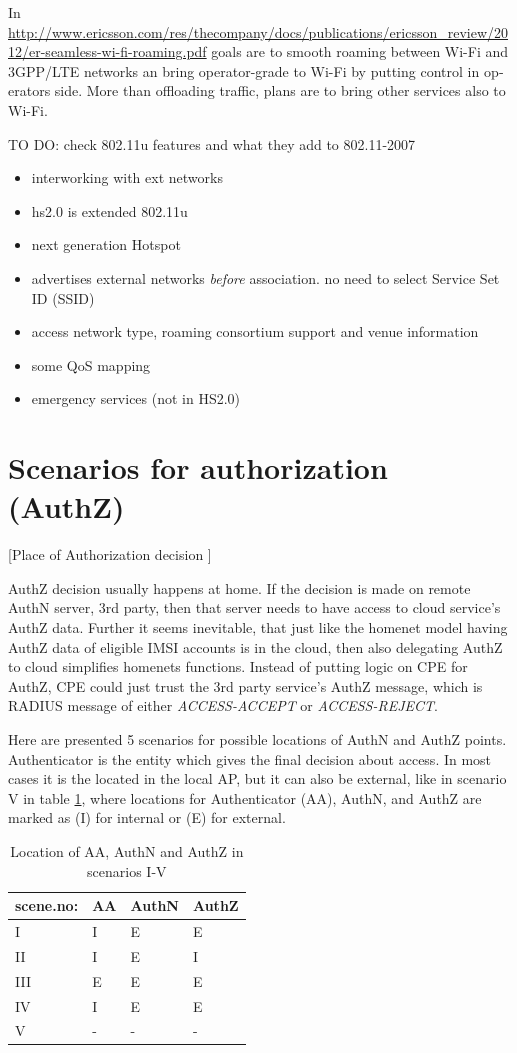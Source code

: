 \documentclass[12pt,a4paper,english]{tutthesis}
\begin{document}
\begin{otherlanguage}{english}
In 
\url{http://www.ericsson.com/res/thecompany/docs/publications/ericsson_review/2012/er-seamless-wi-fi-roaming.pdf}
goals are to smooth roaming between Wi-Fi and 3GPP/LTE networks
an bring operator-grade to Wi-Fi by putting control in operators side. More
than offloading traffic, plans are to bring other services also to Wi-Fi.

TO DO: check 802.11u features and what they add to 802.11-2007
\begin{itemize}
\item interworking with ext networks
\item hs2.0 is extended 802.11u
\item next generation Hotspot
\item advertises external networks \emph{before} association. no need to
select Service Set ID (SSID)
\item access network type, roaming consortium support and venue information
\item some QoS mapping
\item emergency services (not in HS2.0)
\end{itemize}


\section{Scenarios for authorization (AuthZ)}
\label{sec-4-5}

[Place of Authorization decision  ]

AuthZ decision usually happens at home.
If the decision is made on remote AuthN server, 3rd party, 
then that server needs to have access to cloud service's AuthZ data. 
Further it seems inevitable, that just like the homenet model
having AuthZ data of eligible IMSI accounts  is in the cloud, 
then also delegating AuthZ to cloud simplifies homenets
functions. Instead of putting logic on CPE for AuthZ, CPE
could just trust the 3rd party service's AuthZ message, which is 
RADIUS message of either \emph{ACCESS-ACCEPT} or \emph{ACCESS-REJECT}.


Here are presented 5 scenarios for possible locations of AuthN and 
AuthZ points. Authenticator is the entity which gives the final decision 
about access. In most cases it is the located in the
local AP, but it  can also be external, like in scenario V in 
table \ref{table-scenarios}, where locations for Authenticator (AA),
AuthN, and AuthZ are marked as (I) for internal or (E) for external.

\begin{table}[htb]
\caption{\label{table-scenarios}Location of AA, AuthN and AuthZ in scenarios I-V}
\centering
\begin{tabular}{llll}
scene.no: & AA & AuthN & AuthZ\\
\hline
I & I & E & E\\
II & I & E & I\\
III & E & E & E\\
IV & I & E & E\footnotemark\\
V & - & - & -\\
\end{tabular}
\end{table}


\end{otherlanguage}
\end{document}
